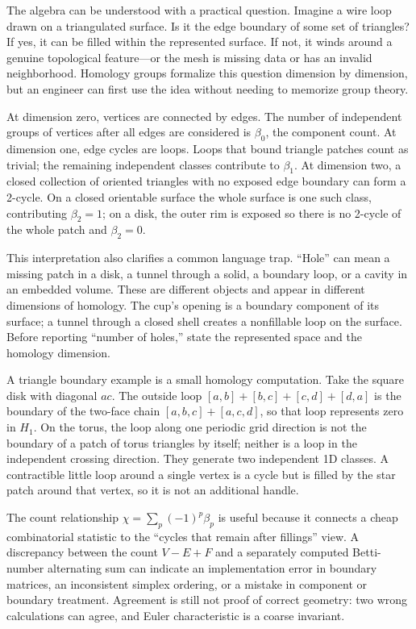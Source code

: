 \hypertarget{03-visual-computing-i-ch002-homology-ask-which-loops-actually-have-a-filling}{}

The algebra can be understood with a practical question. Imagine a wire loop drawn on a triangulated surface. Is it the edge boundary of some set of triangles? If yes, it can be filled within the represented surface. If not, it winds around a genuine topological feature---or the mesh is missing data or has an invalid neighborhood. Homology groups formalize this question dimension by dimension, but an engineer can first use the idea without needing to memorize group theory.

At dimension zero, vertices are connected by edges. The number of independent groups of vertices after all edges are considered is \(\beta_0\), the component count. At dimension one, edge cycles are loops. Loops that bound triangle patches count as trivial; the remaining independent classes contribute to \(\beta_1\). At dimension two, a closed collection of oriented triangles with no exposed edge boundary can form a 2-cycle. On a closed orientable surface the whole surface is one such class, contributing \(\beta_2=1\); on a disk, the outer rim is exposed so there is no 2-cycle of the whole patch and \(\beta_2=0\).

This interpretation also clarifies a common language trap. ``Hole'' can mean a missing patch in a disk, a tunnel through a solid, a boundary loop, or a cavity in an embedded volume. These are different objects and appear in different dimensions of homology. The cup's opening is a boundary component of its surface; a tunnel through a closed shell creates a nonfillable loop on the surface. Before reporting ``number of holes,'' state the represented space and the homology dimension.

A triangle boundary example is a small homology computation. Take the square disk with diagonal \(ac\). The outside loop \([a,b]+[b,c]+[c,d]+[d,a]\) is the boundary of the two-face chain \([a,b,c]+[a,c,d]\), so that loop represents zero in \(H_1\). On the torus, the loop along one periodic grid direction is not the boundary of a patch of torus triangles by itself; neither is a loop in the independent crossing direction. They generate two independent 1D classes. A contractible little loop around a single vertex is a cycle but is filled by the star patch around that vertex, so it is not an additional handle.

The count relationship \(\chi=\sum_p(-1)^p\beta_p\) is useful because it connects a cheap combinatorial statistic to the ``cycles that remain after fillings'' view. A discrepancy between the count \(V-E+F\) and a separately computed Betti-number alternating sum can indicate an implementation error in boundary matrices, an inconsistent simplex ordering, or a mistake in component or boundary treatment. Agreement is still not proof of correct geometry: two wrong calculations can agree, and Euler characteristic is a coarse invariant.

